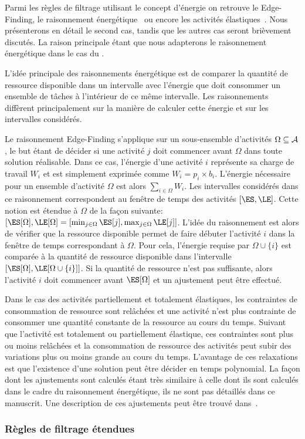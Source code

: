 Parmi les règles de filtrage utilisant le concept d'énergie on
retrouve le Edge-Finding\cite{VilimEF,theseNuijten}, le raisonnement
énergétique~\cite{RELopez} ou encore les activités
élastiques~\cite{BLPN}.  Nous présenterons en détail le second cas,
tandis que les autres cas seront brièvement discutés. La raison
principale étant que nous adapterons le raisonnement énergétique dans
le cas du \CECSP.

L'idée principale des raisonnements énergétique est de comparer la
quantité de ressource disponible dans un intervalle avec l'énergie que
doit consommer un ensemble de tâches à l'intérieur de ce même
intervalle. Les raisonnements diffèrent principalement sur la manière
de calculer cette énergie et sur les intervalles considérés. 

 Le raisonnement Edge-Finding s'applique sur un sous-ensemble
d'activités $\Omega \subseteq {\cal A}$, le but étant de décider si une
activité $j$ doit commencer avant $\Omega$ dans toute solution
réalisable. Dans ce cas, l'énergie d'une activité $i$ représente sa
charge de travail $W_i$ et est simplement exprimée comme
$W_i=p_i\times b_i$. L'énergie nécessaire pour un ensemble d'activité
$\Omega$ est alors $\sum_{i\in \Omega} W_i$. Les intervalles
considérés dans ce raisonnement correspondent au fenêtre de temps des
activités $[\ES,\LE]$. Cette notion est étendue à $\Omega$ de la façon
suivante: $[\ES[\Omega],\LE[\Omega]=[\min_{j \in \Omega}\ES[j],\max_{j
\in \Omega} \LE[j] ]$. L'idée du raisonnement est alors  de vérifier
que la ressource disponible permet de faire débuter l'activité $i$
dans la fenêtre de temps correspondant à $\Omega$. Pour cela,
l'énergie requise par $\Omega \cup \{ i\}$ est comparée à la quantité
de ressource disponible dans l'intervalle $[\ES[\Omega],\LE[\Omega\cup
\{i\}]]$. Si la quantité de ressource n'est pas suffisante, alors
l'activité $i$ doit commencer avant $\ES[\Omega]$ et un ajustement
peut être effectué.

Dans le cas des activités partiellement et totalement élastiques, les
contraintes de consommation de ressource sont relâchées et une
activité n'est plus contrainte de consommer une quantité constante de
la ressource au cours du temps. Suivant que l'activité est totalement
ou partiellement élastique, ces contraintes sont plus ou moins
relâchées et la consommation de ressource des activités peut subir des
variations plus ou moins grande au cours du temps. L'avantage de ces
relaxations est que l'existence d'une solution peut être décider en
temps polynomial. La façon dont les ajustements sont calculés étant
très similaire à celle dont ils sont calculés dans le cadre du
raisonnement énergétique, ils ne sont pas détaillés dans ce
manuscrit. Une description de ces ajustements peut être trouvé
dans~\cite{BLN}. 



\subsubsection{Règles de filtrage étendues}
\label{sec:mix_CUSP}


